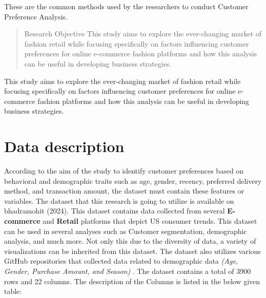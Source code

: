 \documentclass[
  letterpaper,
  DIV=11,
  numbers=noendperiod]{scrartcl}
\begin{document}
These are the common methods used by the researchers to conduct Customer
Preference Analysis.

\begin{quote}
Research Objective This study aims to explore the ever-changing market
of fashion retail while focusing specifically on factors influencing
customer preferences for online e-commerce fashion platforms and how
this analysis can be useful in developing business strategies.
\end{quote}

\begin{tcolorbox}[enhanced jigsaw, opacityback=0, toprule=.15mm, breakable, leftrule=.75mm, coltitle=black, title=\textcolor{quarto-callout-note-color}{\faInfo}\hspace{0.5em}{Research Objective}, opacitybacktitle=0.6, colback=white, left=2mm, colframe=quarto-callout-note-color-frame, toptitle=1mm, colbacktitle=quarto-callout-note-color!10!white, rightrule=.15mm, titlerule=0mm, arc=.35mm, bottomtitle=1mm, bottomrule=.15mm]

This study aims to explore the ever-changing market of fashion retail
while focusing specifically on factors influencing customer preferences
for online e-commerce fashion platforms and how this analysis can be
useful in developing business strategies.

\end{tcolorbox}

\newpage

\section{Data description}\label{data-description}

According to the aim of the study to identify customer preferences based
on behavioral and demographic traits such as age, gender, recency,
preferred delivery method, and transaction amount, the dataset must
contain these features or variables. The dataset that this research is
going to utilize is available on bhadramohit (2024). This dataset
contains data collected from several \textbf{E-commerce} and
\textbf{Retail} platforms that depict US consumer trends. This dataset
can be used in several analyses such as Customer segmentation,
demographic analysis, and much more. Not only this due to the diversity
of data, a variety of visualizations can be inherited from this dataset.
The dataset also utilizes various GitHub repositories that collected
data related to demographic data \emph{(Age, Gender, Purchase Amount,
and Season) }. The dataset contains a total of 3900 rows and 22 columns.
The description of the Columns is listed in the below given table:
\end{document}
